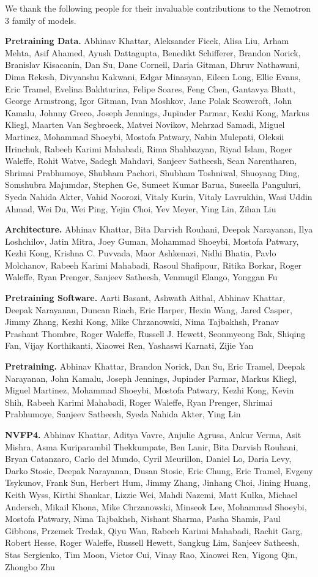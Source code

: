 \documentclass[11pt, logo, onecolumn, copyright, colorlinks=true, allcolors=blue]{nvidiatechreport}
\begin{document}
We thank the following people for their invaluable contributions to the Nemotron 3 family of models.

\textbf{Pretraining Data.} Abhinav Khattar, Aleksander Ficek, Alisa Liu, Arham Mehta, Asif Ahamed, Ayush Dattagupta, Benedikt Schifferer, Brandon Norick, Branislav Kisacanin, Dan Su, Dane Corneil, Daria Gitman, Dhruv Nathawani, Dima Rekesh, Divyanshu Kakwani, Edgar Minasyan, Eileen Long, Ellie Evans, Eric Tramel, Evelina Bakhturina, Felipe Soares, Feng Chen, Gantavya Bhatt, George Armstrong, Igor Gitman, Ivan Moshkov, Jane Polak Scowcroft, John Kamalu, Johnny Greco, Joseph Jennings, Jupinder Parmar, Kezhi Kong, Markus Kliegl, Maarten Van Segbroeck, Matvei Novikov, Mehrzad Samadi, Miguel Martinez, Mohammad Shoeybi, Mostofa Patwary, Nabin Mulepati, Oleksii Hrinchuk, Rabeeh Karimi Mahabadi, Rima Shahbazyan, Riyad Islam, Roger Waleffe, Rohit Watve, Sadegh Mahdavi, Sanjeev Satheesh, Sean Narentharen, Shrimai Prabhumoye, Shubham Pachori, Shubham Toshniwal, Shuoyang Ding, Somshubra Majumdar, Stephen Ge, Sumeet Kumar Barua, Suseella Panguluri, Syeda Nahida Akter, Vahid Noorozi, Vitaly Kurin, Vitaly Lavrukhin, Wasi Uddin Ahmad, Wei Du, Wei Ping, Yejin Choi, Yev Meyer, Ying Lin, Zihan Liu

\textbf{Architecture.} Abhinav Khattar, Bita Darvish Rouhani, Deepak Narayanan, Ilya Loshchilov, Jatin Mitra, Joey Guman, Mohammad Shoeybi, Mostofa Patwary, Kezhi Kong, Krishna C. Puvvada, Maor Ashkenazi, Nidhi Bhatia, Pavlo Molchanov, Rabeeh Karimi Mahabadi, Rasoul Shafipour, Ritika Borkar, Roger Waleffe, Ryan Prenger, Sanjeev Satheesh, Venmugil Elango, Yonggan Fu

\textbf{Pretraining Software.} Aarti Basant, Ashwath Aithal, Abhinav Khattar, Deepak Narayanan, Duncan Riach, Eric Harper, Hexin Wang, Jared Casper, Jimmy Zhang, Kezhi Kong, Mike Chrzanowski, Nima Tajbakhsh, Pranav Prashant Thombre, Roger Waleffe, Russell J. Hewett, Seonmyeong Bak, Shiqing Fan, Vijay Korthikanti, Xiaowei Ren, Yashaswi Karnati, Zijie Yan

\textbf{Pretraining.} Abhinav Khattar, Brandon Norick, Dan Su, Eric Tramel, Deepak Narayanan, John Kamalu, Joseph Jennings, Jupinder Parmar, Markus Kliegl, Miguel Martinez, Mohammad Shoeybi, Mostofa Patwary, Kezhi Kong, Kevin Shih, Rabeeh Karimi Mahabadi, Roger Waleffe, Ryan Prenger, Shrimai Prabhumoye, Sanjeev Satheesh, Syeda Nahida Akter, Ying Lin 

\textbf{NVFP4.} Abhinav Khattar, Aditya Vavre, Anjulie Agrusa, Ankur Verma, Asit Mishra, Asma Kuriparambil Thekkumpate, Ben Lanir, Bita Darvish Rouhani, Bryan Catanzaro, Carlo del Mundo, Cyril Meurillon, Daniel Lo, Daria Levy, Darko Stosic, Deepak Narayanan, Dusan Stosic, Eric Chung, Eric Tramel, Evgeny Tsykunov, Frank Sun, Herbert Hum, Jimmy Zhang, Jinhang Choi, Jining Huang, Keith Wyss, Kirthi Shankar, Lizzie Wei, Mahdi Nazemi, Matt Kulka, Michael Andersch, Mikail Khona, Mike Chrzanowski, Minseok Lee, Mohammad Shoeybi, Mostofa Patwary, Nima Tajbakhsh, Nishant Sharma, Pasha Shamis, Paul Gibbons, Przemek Tredak, Qiyu Wan, Rabeeh Karimi Mahabadi, Rachit Garg, Robert Hesse, Roger Waleffe, Russell Hewett, Sangkug Lim, Sanjeev Satheesh, Stas Sergienko, Tim Moon, Victor Cui, Vinay Rao, Xiaowei Ren, Yigong Qin, Zhongbo Zhu
\end{document}
